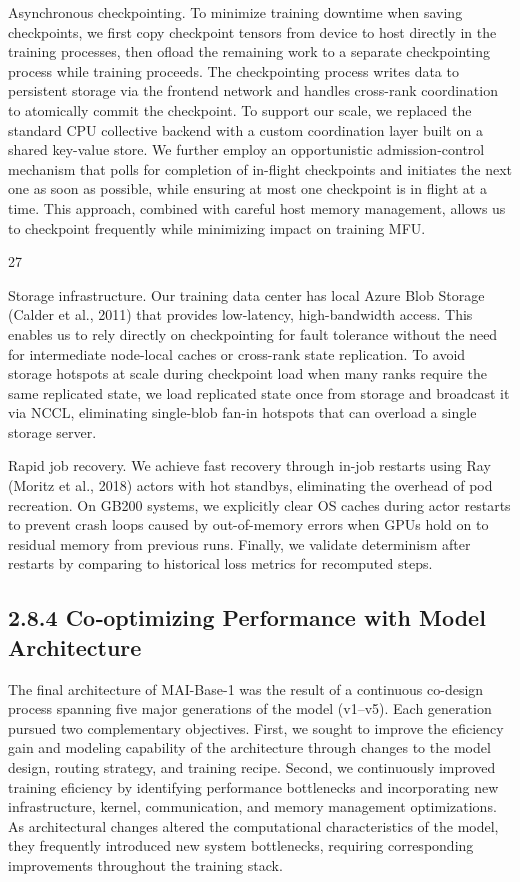 \documentclass[
  10
]{article}
\begin{document}
Asynchronous checkpointing. To minimize training downtime when saving
checkpoints, we first copy checkpoint tensors from device to host
directly in the training processes, then ofload the remaining work to a
separate checkpointing process while training proceeds. The
checkpointing process writes data to persistent storage via the frontend
network and handles cross-rank coordination to atomically commit the
checkpoint. To support our scale, we replaced the standard CPU
collective backend with a custom coordination layer built on a shared
key-value store. We further employ an opportunistic admission-control
mechanism that polls for completion of in-flight checkpoints and
initiates the next one as soon as possible, while ensuring at most one
checkpoint is in flight at a time. This approach, combined with careful
host memory management, allows us to checkpoint frequently while
minimizing impact on training MFU.

27

Storage infrastructure. Our training data center has local Azure Blob
Storage (Calder et al., 2011) that provides low-latency, high-bandwidth
access. This enables us to rely directly on checkpointing for fault
tolerance without the need for intermediate node-local caches or
cross-rank state replication. To avoid storage hotspots at scale during
checkpoint load when many ranks require the same replicated state, we
load replicated state once from storage and broadcast it via NCCL,
eliminating single-blob fan-in hotspots that can overload a single
storage server.

Rapid job recovery. We achieve fast recovery through in-job restarts
using Ray (Moritz et al., 2018) actors with hot standbys, eliminating
the overhead of pod recreation. On GB200 systems, we explicitly clear OS
caches during actor restarts to prevent crash loops caused by
out-of-memory errors when GPUs hold on to residual memory from previous
runs. Finally, we validate determinism after restarts by comparing to
historical loss metrics for recomputed steps.

\subsection{2.8.4 Co‐optimizing Performance with Model
Architecture}\label{cooptimizing-performance-with-model-architecture}

The final architecture of MAI-Base-1 was the result of a continuous
co-design process spanning five major generations of the model (v1--v5).
Each generation pursued two complementary objectives. First, we sought
to improve the eficiency gain and modeling capability of the
architecture through changes to the model design, routing strategy, and
training recipe. Second, we continuously improved training eficiency by
identifying performance bottlenecks and incorporating new
infrastructure, kernel, communication, and memory management
optimizations. As architectural changes altered the computational
characteristics of the model, they frequently introduced new system
bottlenecks, requiring corresponding improvements throughout the
training stack.
\end{document}
